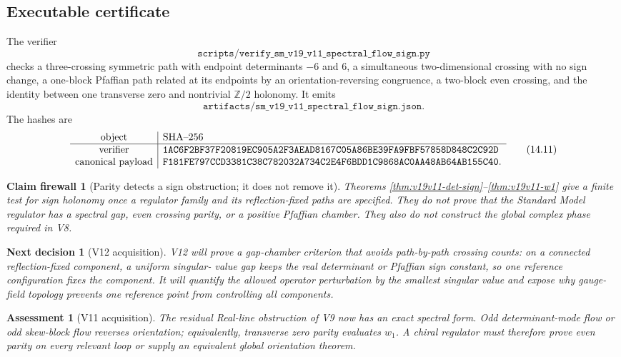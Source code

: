 \documentclass[11pt]{article}
\newtheorem{firewall}[theorem]{Claim firewall}
\newtheorem{decision}[theorem]{Next decision}
\newtheorem{assessment}[theorem]{Assessment}
\theoremstyle{remark}
\begin{document}
\subsection{Executable certificate}

The verifier
\[
 \texttt{scripts/verify\_sm\_v19\_v11\_spectral\_flow\_sign.py} \tag{14.9}
\]
checks a three-crossing symmetric path with endpoint determinants
\(-6\) and \(6\), a simultaneous two-dimensional crossing with no sign
change, a one-block Pfaffian path related at its endpoints by an
orientation-reversing congruence, a two-block even crossing, and the
identity between one transverse zero and nontrivial \(\mathbb Z/2\)
holonomy.  It emits
\[
 \texttt{artifacts/sm\_v19\_v11\_spectral\_flow\_sign.json}.    \tag{14.10}
\]
The hashes are
\[
\begin{array}{c|l}
\hbox{object}&\hbox{SHA--256}\\ \hline
\hbox{verifier}&
\texttt{1AC6F2BF37F20819EC905A2F3AEAD8167C05A86BE39FA9FBF57858D848C2C92D}\\
\hbox{canonical payload}&
\texttt{F181FE797CCD3381C38C782032A734C2E4F6BDD1C9868AC0AA48AB64AB155C40}.
\end{array}                                                     \tag{14.11}
\]

\begin{firewall}[Parity detects a sign obstruction; it does not remove it]
\label{fire:v19v11}
Theorems \ref{thm:v19v11-det-sign}--\ref{thm:v19v11-w1} give a finite
test for sign holonomy once a regulator family and its reflection-fixed
paths are specified.  They do not prove that the Standard Model regulator
has a spectral gap, even crossing parity, or a positive Pfaffian chamber.
They also do not construct the global complex phase required in V8.
\end{firewall}

\begin{decision}[V12 acquisition]
\label{dec:v19v11-next}
V12 will prove a gap-chamber criterion that avoids path-by-path crossing
counts: on a connected reflection-fixed component, a uniform singular-
value gap keeps the real determinant or Pfaffian sign constant, so one
reference configuration fixes the component.  It will quantify the
allowed operator perturbation by the smallest singular value and expose
why gauge-field topology prevents one reference point from controlling
all components.
\end{decision}

\begin{assessment}[V11 acquisition]
\label{ass:v19v11}
The residual Real-line obstruction of V9 now has an exact spectral form.
Odd determinant-mode flow or odd skew-block flow reverses orientation;
equivalently, transverse zero parity evaluates \(w_1\).  A chiral regulator
must therefore prove even parity on every relevant loop or supply an
equivalent global orientation theorem.
\end{assessment}
\end{document}
